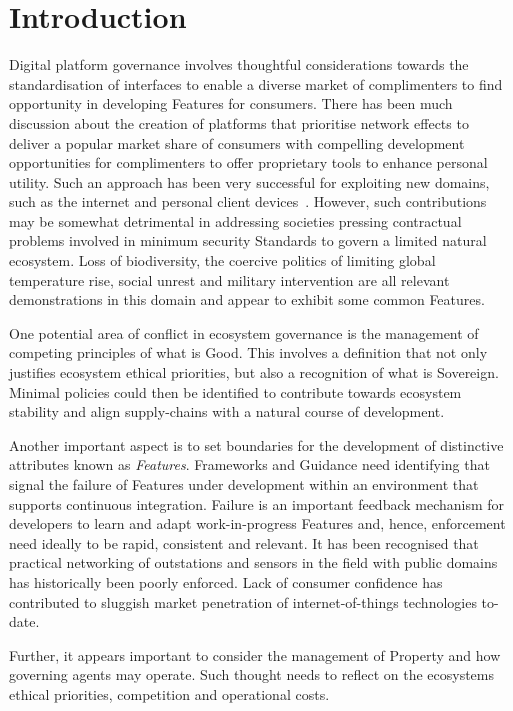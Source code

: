 \documentclass[11pt, oneside]{article}   	%
\begin{document}
\section{Introduction}
Digital platform governance involves thoughtful considerations towards the standardisation of interfaces to enable a diverse market of complimenters to find opportunity in developing Features for consumers.
There has been much discussion about the creation of platforms that prioritise network effects to deliver a popular market share of consumers with compelling development opportunities for complimenters to offer proprietary tools to enhance personal utility.
Such an approach has been very successful for exploiting new domains, such as the internet and personal client devices~\cite{bop1}.
However, such contributions may be somewhat detrimental in addressing societies pressing contractual problems involved in minimum security Standards to govern a limited natural ecosystem.
Loss of biodiversity, the coercive politics of limiting global temperature rise, social unrest and military intervention are all relevant demonstrations in this domain and appear to exhibit some common Features.\

One potential area of conflict in ecosystem governance is the management of competing principles of what is Good.
This involves a definition that not only justifies ecosystem ethical priorities, but also a recognition of what is Sovereign.
Minimal policies could then be identified to contribute towards ecosystem stability and align supply-chains with a natural course of development.\

Another important aspect is to set boundaries for the development of distinctive attributes known as \emph{Features}.
Frameworks and Guidance need identifying that signal the failure of Features under development within an environment that supports continuous integration.
Failure is an important feedback mechanism for developers to learn and adapt work-in-progress Features and, hence, enforcement need ideally to be rapid, consistent and relevant.
It has been recognised that practical networking of outstations and sensors in the field with public domains has historically been poorly enforced.
Lack of consumer confidence has contributed to sluggish market penetration of internet-of-things technologies to-date.\

Further, it appears important to consider the management of Property and how governing agents may operate.
Such thought needs to reflect on the ecosystems ethical priorities, competition and operational costs.\
\end{document}
